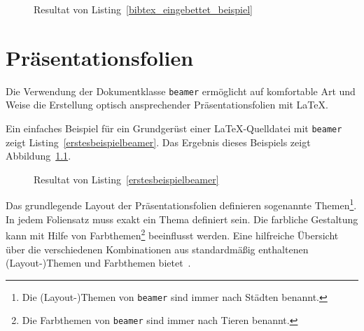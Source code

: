 \documentclass[a4paper,10pt,twoside]{scrbook}
\begin{document}


\begin{figure}[H]
	\caption{Resultat von Listing~\ref{bibtex_eingebettet_beispiel}}
	\label{fig_bibtex_eingebettet_beispiel}
\end{figure}


\chapter{Präsentationsfolien}
\label{Kapitel_Praesentationsfolien}

Die Verwendung der Dokumentklasse \verb!beamer! ermöglicht auf komfortable Art und Weise die Erstellung optisch ansprechender Präsentationsfolien mit \LaTeX. 


Ein einfaches Beispiel für ein Grundgerüst einer \LaTeX-Quelldatei mit \verb|beamer| zeigt Listing~\ref{erstesbeispielbeamer}. Das Ergebnis dieses Beispiels zeigt Abbildung~\ref{fig_erstesbeispielbeamer}.





\begin{figure}[H]
	\caption{Resultat von Listing~\ref{erstesbeispielbeamer}}
	\label{fig_erstesbeispielbeamer}
\end{figure}



Das grundlegende Layout der Präsentationsfolien definieren sogenannte Themen\footnote{Die (Layout-)Themen von \texttt{beamer} sind immer nach Städten benannt.}. In jedem Foliensatz muss exakt ein Thema definiert sein. 
Die farbliche Gestaltung kann mit Hilfe von Farbthemen\footnote{Die Farbthemen von \texttt{beamer} sind immer nach Tieren benannt.} beeinflusst werden. Eine hilfreiche Übersicht über die verschiedenen Kombinationen aus standardmäßig enthaltenen (Layout-)Themen und Farbthemen bietet~\cite{BeamerThemeMatrixWebseite}. 
\end{document}
